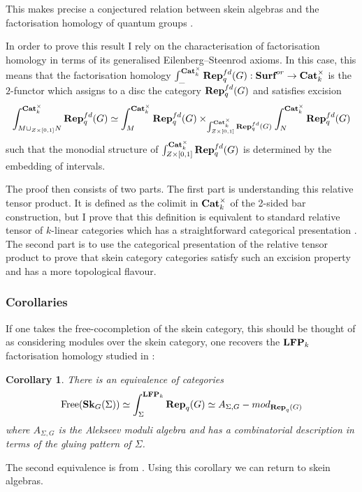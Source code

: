 \documentclass{article}
\newcommand{\catname}[1]{{\normalfont\textbf{#1}}}
\newcommand{\Cat}{\catname{Cat}}
\newcommand{\LFP}{\catname{LFP}}
\newcommand{\SK}{\catname{Sk}}
\newcommand{\Rep}{\catname{Rep}}
\newcommand{\Surf}{\catname{Surf}}
\newcommand{\Free}{\operatorname{Free}}
\newtheorem{cor}[thm]{Corollary}
\begin{document}
This makes precise a conjectured relation between skein algebras and the factorisation homology of quantum groups \cite{david1, JohnsonFreyd19}.

In order to prove this result I rely on the characterisation of factorisation homology in terms of its generalised Eilenberg–Steenrod axioms. In this case, this means that the factorisation homology $\int_{\_}^{\Cat_k^{\times}} \Rep^{fd}_q(G): \Surf^{or} \to \Cat_k^{\times}$ is the $2$-functor which assigns to a disc the category $\Rep^{fd}_q(G)$ and satisfies excision 
$$\int_{M \cup_{Z \times [0,1]} N}^{\Cat_k^{\times}} \Rep^{fd}_q(G) \simeq \int_{M}^{\Cat_k^{\times}} \Rep^{fd}_q(G) \times_{\int_{Z \times [0,1]}^{\Cat_k^{\times}} \Rep^{fd}_q(G) } \int_{N}^{\Cat_k^{\times}} \Rep^{fd}_q(G) $$
 such that the monodial structure of $\int_{Z \times [0,1]}^{\Cat_k^{\times}} \Rep^{fd}_q(G)$ is determined by the embedding of intervals. 

The proof then consists of two parts. The first part is understanding this relative tensor product. It is defined as the colimit in $\Cat_k^{\times}$ of the 2-sided bar construction, but I prove that this definition is equivalent to standard relative tensor of $k$-linear categories which has a straightforward categorical presentation \cite{Tambara01}. The second part is to use the categorical presentation of the relative tensor product to prove that skein category categories satisfy such an excision property and has a more topological flavour. 

\subsubsection{Corollaries}

If one takes the free-cocompletion of the skein category, this should be thought of as considering modules over the skein category, one recovers the $\LFP_k$ factorisation homology studied in \cite{david1}:

\begin{cor}\textup{\cite{C2}}
There is an equivalence of categories 
\[
\Free(\SK_G(\Sigma)) \simeq \int_{\Sigma}^{\LFP_k} \Rep_q(G) \simeq A_{\Sigma, G}-mod_{\Rep_q(G)}
\]
where $A_{\Sigma, G}$ is the Alekseev moduli algebra and has a combinatorial description in terms of the gluing pattern of $\Sigma$.
\end{cor}

The second equivalence is from \cite{david1}. Using this corollary we can return to skein algebras.
\end{document}
